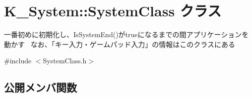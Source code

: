 \hypertarget{class_k___system_1_1_system_class}{}\section{K\+\_\+\+System\+:\+:System\+Class クラス}
\label{class_k___system_1_1_system_class}


一番初めに初期化し、\+Is\+System\+End()がtrueになるまでの間アプリケーションを動かす~\newline
なお、「キー入力・ゲームパッド入力」の情報はこのクラスにある  




{\ttfamily \#include $<$System\+Class.\+h$>$}

\subsection*{公開メンバ関数}

